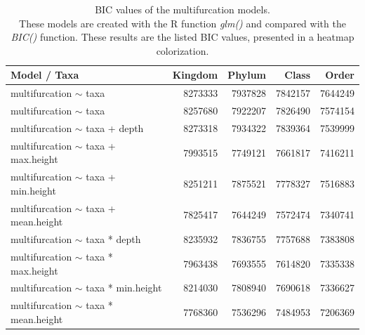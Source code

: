       \begin{table}[h]
        \begin{center}
          \begin{tabular}{ |l|r|r|r|r| }
            \hline
            \bfseries Model / Taxa & \bfseries Kingdom & \bfseries Phylum & \bfseries Class & \bfseries Order \\
            \hline \hline
            multifurcation $\sim$ taxa & 8273333 & {\cellcolor{green!15}}7937828 & {\cellcolor{green!20}}7842157 & {\cellcolor{green!30}}7644249 \\
            multifurcation $\sim$ taxa & 8257680 & {\cellcolor{green!15}}7922207 & {\cellcolor{green!20}}7826490 & {\cellcolor{green!35}}7574154 \\
            \hline
            multifurcation $\sim$ taxa + depth & 8273318 & {\cellcolor{green!15}}7934322 & {\cellcolor{green!20}}7839364 & {\cellcolor{green!35}}7539999 \\
            multifurcation $\sim$ taxa + max.height & {\cellcolor{green!15}}7993515 & {\cellcolor{green!25}}7749121 & {\cellcolor{green!30}}7661817 & {\cellcolor{green!40}}7416211 \\
            multifurcation $\sim$ taxa + min.height & 8251211 & {\cellcolor{green!20}}7875521  & {\cellcolor{green!25}}7778327 & {\cellcolor{green!35}}7516883 \\
            multifurcation $\sim$ taxa + mean.height & {\cellcolor{green!20}}7825417 & {\cellcolor{green!30}}7644249 & {\cellcolor{green!35}}7572474 & {\cellcolor{green!45}}7340741 \\
            \hline
            multifurcation $\sim$ taxa * depth & 8235932 & {\cellcolor{green!20}}7836755 & {\cellcolor{green!25}}7757688 & {\cellcolor{green!45}}7383808 \\
            multifurcation $\sim$ taxa * max.height & {\cellcolor{green!15}}7963438 & {\cellcolor{green!30}}7693555 & {\cellcolor{green!30}}7614820 & {\cellcolor{green!45}}7335338 \\
            multifurcation $\sim$ taxa * min.height & 8214030 & {\cellcolor{green!20}}7808940 & {\cellcolor{green!30}}7690618 & {\cellcolor{green!45}}7336627\\
            multifurcation $\sim$ taxa * mean.height & {\cellcolor{green!25}}7768360 & {\cellcolor{green!35}}7536296 & {\cellcolor{green!50}}7484953 & {\cellcolor{green!50}}7206369 \\
            \hline
          \end{tabular} 
        \end{center}
        \caption{BIC values of the multifurcation models. \\
          These models are created with the R function \textit{glm()} and compared with the \textit{BIC()} 
            function. These results are the listed BIC values, presented in a heatmap colorization.}
        \label{table:BIC multifurcation} 
      \end{table}
